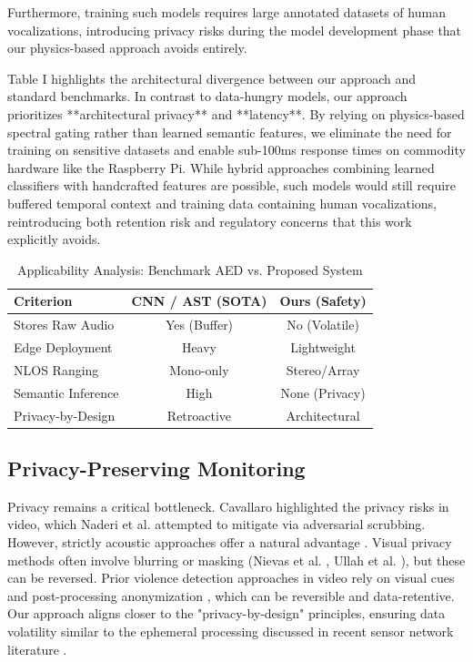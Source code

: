 \documentclass[conference]{IEEEtran}
\begin{document}
Furthermore, training such models requires large annotated datasets of human vocalizations, introducing privacy risks during the model development phase that our physics-based approach avoids entirely.

Table I highlights the architectural divergence between our approach and standard benchmarks. In contrast to data-hungry models, our approach prioritizes **architectural privacy** and **latency**. By relying on physics-based spectral gating rather than learned semantic features, we eliminate the need for training on sensitive datasets and enable sub-100ms response times on commodity hardware like the Raspberry Pi. While hybrid approaches combining learned classifiers with handcrafted features are possible, such models would still require buffered temporal context and training data containing human vocalizations, reintroducing both retention risk and regulatory concerns that this work explicitly avoids.

\begin{table}[htbp]
\caption{Applicability Analysis: Benchmark AED vs. Proposed System}
\begin{center}
\begin{tabular}{lcc}
\toprule
\textbf{Criterion} & \textbf{CNN / AST (SOTA)} & \textbf{Ours (Safety)} \\
\midrule
Stores Raw Audio & Yes (Buffer) & No (Volatile) \\
Edge Deployment & Heavy & Lightweight \\
NLOS Ranging & Mono-only & Stereo/Array \\
Semantic Inference & High & None (Privacy) \\
Privacy-by-Design & Retroactive & Architectural \\
\bottomrule
\end{tabular}
\end{center}
\label{tab:comparison}
\end{table}

\subsection{Privacy-Preserving Monitoring}
Privacy remains a critical bottleneck. Cavallaro \cite{b1} highlighted the privacy risks in video, which Naderi et al. \cite{b4} attempted to mitigate via adversarial scrubbing. However, strictly acoustic approaches offer a natural advantage \cite{b2}. Visual privacy methods often involve blurring or masking (Nievas et al. \cite{b16}, Ullah et al. \cite{b17}), but these can be reversed. Prior violence detection approaches in video rely on visual cues and post-processing anonymization \cite{b16, b17}, which can be reversible and data-retentive. Our approach aligns closer to the "privacy-by-design" principles, ensuring data volatility similar to the ephemeral processing discussed in recent sensor network literature \cite{b21}.
\end{document}

